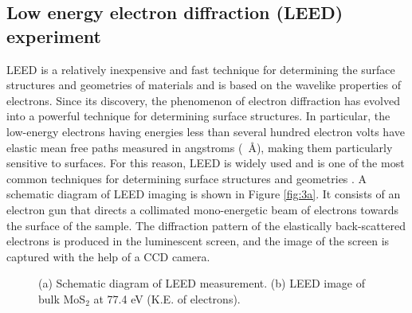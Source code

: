 \documentclass[12pt]{article}
\begin{document}
\subsection{Low energy electron diffraction (LEED) experiment}
LEED is a relatively inexpensive and fast technique for determining the surface structures and geometries of materials and is based on the wavelike properties of electrons. Since its discovery, the phenomenon of electron diffraction has evolved into a powerful technique for determining surface structures. In particular, the low-energy electrons having energies less than several hundred electron volts have elastic mean free paths measured in angstroms (\SI{}{\angstrom}), making them particularly sensitive to surfaces. For this reason, LEED is widely used and is one of the most common techniques for determining surface structures and geometries \cite{watson2003nist,van2009atomic,soares2011advances}. A schematic diagram of LEED imaging is shown in Figure \ref{fig:3a}. It consists of an electron gun that directs a collimated mono-energetic beam of electrons towards the surface of the sample. The diffraction pattern of the elastically back-scattered electrons is produced in the luminescent screen, and the image of the screen is captured with the help of a CCD camera.


\begin{figure}[H]
\centering
{}\quad \hspace{45pt}
\caption{(a) Schematic diagram of LEED measurement. (b) LEED image of bulk MoS$_2$ at 77.4 eV (K.E. of electrons).}
\end{figure}
\end{document}
